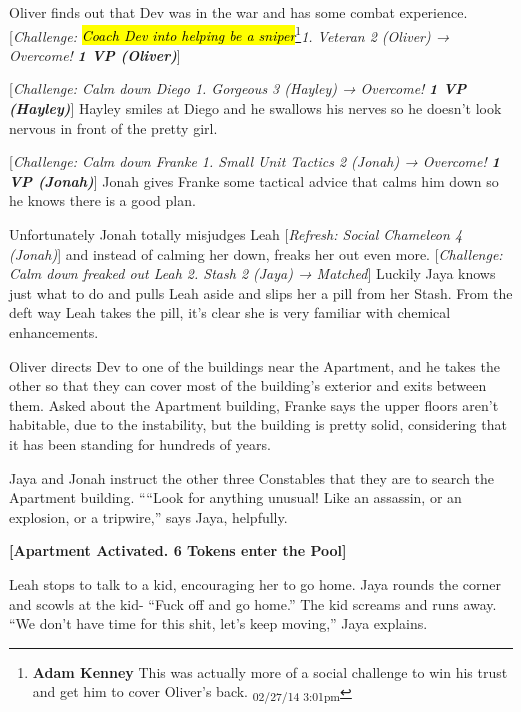 Oliver finds out that Dev was in the war and has some combat experience. {[}\textit{Challenge: }\textit{\hl{Coach Dev into helping be a sniper}}\footnote{\textbf{Adam Kenney }This was actually more of a social challenge to win his trust and get him to cover Oliver's back. \textsubscript{02/27/14 3:01pm}}\textit{1. Veteran 2 (Oliver) → Overcome! }\textit{\textbf{1 VP (Oliver)}}{]}



{[}\textit{Challenge: Calm down Diego 1. Gorgeous 3 (Hayley) → Overcome! }\textit{\textbf{1 VP (Hayley)}}{]}  Hayley smiles at Diego and he swallows his nerves so he doesn't look nervous in front of the pretty girl.



{[}\textit{Challenge: Calm down Franke 1. Small Unit Tactics 2 (Jonah) → Overcome! }\textit{\textbf{1 VP (Jonah)}}{]} Jonah gives Franke some tactical advice that calms him down so he knows there is a good plan. 



Unfortunately Jonah totally misjudges Leah {[}\textit{Refresh: Social Chameleon 4 (Jonah)}{]} and instead of calming her down, freaks her out even more.  {[}\textit{Challenge: Calm down freaked out Leah 2. Stash 2 (Jaya) →  Matched}{]} Luckily Jaya knows just what to do and pulls Leah aside and slips her a pill from her Stash.  From the deft way Leah takes the pill, it's clear she is very familiar with chemical enhancements.



Oliver directs Dev to one of the buildings near the Apartment, and he takes the other so that they can cover most of the building's exterior and exits between them.  Asked about the Apartment building, Franke says the upper floors aren't habitable, due to the instability, but the building is pretty solid, considering that it has been standing for hundreds of years.



Jaya and Jonah instruct the other three Constables that they are to search the Apartment building.  ````Look for anything unusual!  Like an assassin, or an explosion, or a tripwire,'' says Jaya, helpfully.  



\textbf{{[}Apartment Activated.  6 Tokens enter the Pool{]}}



Leah stops to talk to a kid, encouraging her to go home.  Jaya rounds the corner and scowls at the kid- ``Fuck off and go home.''  The kid screams and runs away.  ``We don't have time for this shit, let's keep moving,'' Jaya explains.



